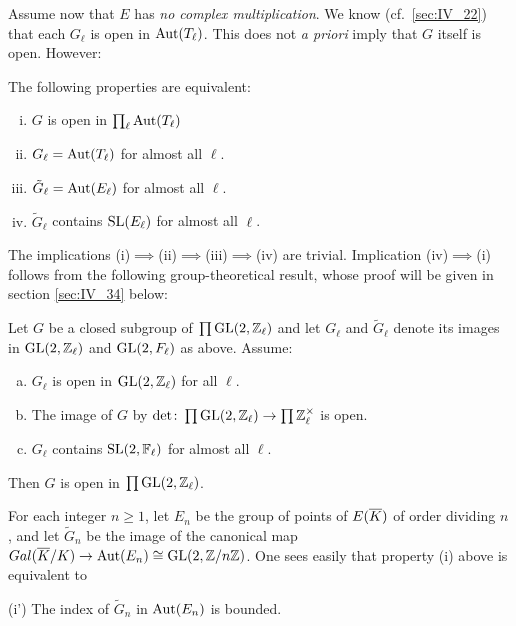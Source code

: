 Assume now that $E$ has \emph{no complex multiplication}. We know (cf.\
\ref{sec:IV_22}) that each $G_\ell$ is open in $\operatorname{Aut}(T_\ell)$. This does not
\emph{a priori} imply that $G$ itself is open. However:

\begin{prop}
The following properties are equivalent:
\begin{enumerate}[(i)]
	\item $G$ is open in $\prod_\ell \operatorname{Aut}(T_\ell)$
	\item $G_\ell = \operatorname{Aut}(T_\ell)$ for almost all $\ell$.
	\item $\tilde{G}_\ell = \operatorname{Aut}(E_\ell)$ for almost all $\ell$.
	\item $\tilde{G}_\ell$ contains $\operatorname{SL}(E_\ell)$ for almost all $\ell$.
\end{enumerate}
\end{prop}

The implications (i)$\implies$(ii)$\implies$(iii)$\implies$(iv) are trivial.
Implication (iv)$\implies$(i) follows from the following group-theoretical
result, whose proof will be given in section \ref{sec:IV_34} below:

\begin{lem}
Let $G$ be a closed subgroup of $\prod \operatorname{GL}(2, \mathbb{Z}_\ell)$ and 
let $G_\ell$ and $\tilde{G}_\ell$ denote its images in $\operatorname{GL}(2, \mathbb{Z}_\ell)$ and
$\operatorname{GL}(2, F_\ell)$ as above. Assume:
\begin{enumerate}[(a)]
	\item $G_\ell$ is open in $\operatorname{GL}(2, \mathbb{Z}_\ell)$ for all $\ell$.
	\item The image of $G$ by $\det \colon \prod \operatorname{GL}(2, \mathbb{Z}_\ell) \to \prod
\mathbb{Z}^\times_\ell$ is open.
	\item $G_\ell$ contains $\operatorname{SL}(2,\mathbb{F}_\ell)$ for almost all $\ell$.
\end{enumerate}
Then $G$ is open in $\prod \operatorname{GL}(2, \mathbb{Z}_\ell)$.
\end{lem}

\begin{obs}
	For each integer $n \geq 1$, let $E_n$ be the group of points of
$E(\overline{K})$ of order dividing $n$, and let $\tilde{G}_n$ be the image of the
canonical map $Gal(\overline{K}/K) \to \operatorname{Aut}(E_n) \cong \operatorname{GL}(2, \mathbb{Z} / n\mathbb{Z})$. One
sees easily that property (i) above is equivalent to 

\begin{center}
	(i') The index of $\tilde{G}_n$ in $\operatorname{Aut}(E_n)$ is bounded.
\end{center}
\end{obs}

